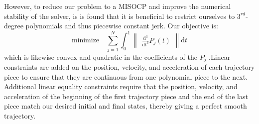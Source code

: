 However, to reduce our problem to a MISOCP and improve the numerical stability of the solver, is is found that it is beneficial to restrict ourselves to $3^{rd}$-degree polynomials and thus piecewise constant jerk. Our objective is:
\begin{equation} \label{eq:eq19_deits}
\text{minimize} \quad \sum_{j=1}^{N} \int_{0}^{1}\begin{Vmatrix}\frac{\mathrm{d}^3 }{\mathrm{d} t^3}
P_{j}(t) 
\end{Vmatrix}{\mathrm{d}t}
\end{equation}which is likewise convex and quadratic in the coefficients
of the $P_j$ .Linear constraints are added on the position,
velocity, and acceleration of each trajectory piece to ensure
that they are continuous from one polynomial piece to the
next. Additional linear equality constraints require that the
position, velocity, and acceleration of the beginning of the
first trajectory piece and the end of the last piece match our
desired initial and final states, thereby giving a perfect smooth trajectory.
